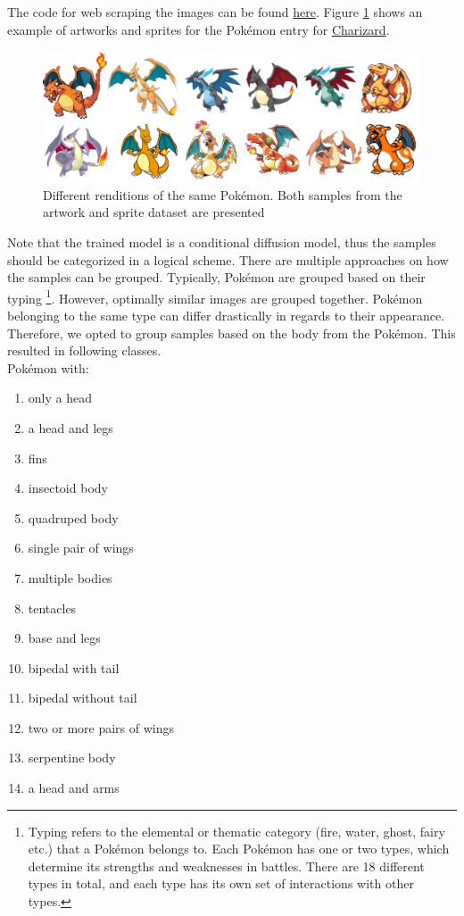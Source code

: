 \documentclass[12pt]{article}
\theoremstyle{plain}
\theoremstyle{definition}
\theoremstyle{remark}
\begin{document}
The code for web scraping the images can be found \href{https://github.com/mhueppe/Diffusion_Models/tree/master/preprocessing}{here}. Figure \ref{fig:variouscharizard} shows an example of artworks and sprites for the Pokémon entry for \href{https://pokemondb.net/pokedex/charizard}{Charizard}.

\begin{figure}[h]
	\centering
	\includegraphics[width=\linewidth]{src/Images/various_charizard}
	\caption[Different Pokémon renditions]{Different renditions of the same Pokémon. Both samples from the artwork and sprite dataset are presented}
	\label{fig:variouscharizard}
\end{figure}

Note that the trained model is a conditional diffusion model, thus the samples should be categorized in a logical scheme.  There are multiple approaches on how the samples can be grouped. Typically, Pokémon are grouped based on their typing \footnote{Typing refers to the elemental or thematic category (fire, water, ghost, fairy etc.) that a Pokémon belongs to. Each Pokémon has one or two types, which determine its strengths and weaknesses in battles. There are 18 different types in total, and each type has its own set of interactions with other types.}. However, optimally similar images are grouped together. Pokémon belonging to the same type can differ drastically in regards to their appearance. Therefore, we opted to group samples based on the body from the Pokémon. 
This resulted in following classes.\\

Pokémon with: 

\begin{multicols}{3}
	\begin{enumerate}[itemsep=2pt,parsep=2pt]
		\item only a head
		\item a head and legs
		\item fins
		\item insectoid body
		\item quadruped body
		\item single pair of wings
		\item multiple bodies
		\item tentacles
		\item base and legs
		\item bipedal with tail
		\item bipedal without tail
		\item two or more pairs of wings
		\item serpentine body
		\item a head and arms
	\end{enumerate}
\end{multicols}
\end{document}
